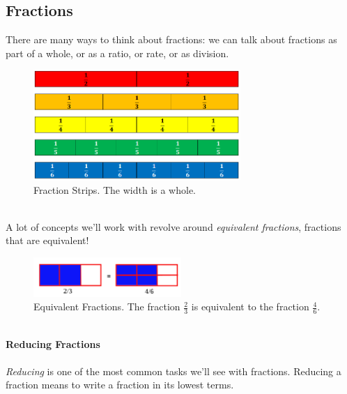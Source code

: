 \subsection{Fractions}
There are many ways to think about fractions: we can talk about fractions as part of a whole, or as a ratio, or rate, or as division.  
\begin{figure}[h!]
    \centering
    \includegraphics[width=0.7\textwidth]{img/FractionStrips.png}
    \caption{Fraction Strips. The width is a whole.}
    \label{fig:fraction-strips}
\end{figure}
\\
A lot of concepts we'll work with revolve around \emph{equivalent fractions}, fractions that are equivalent!
\begin{figure}[h!]
    \centering
    \includegraphics[width=0.5\textwidth]{img/fraction2-3.png}
    \caption{Equivalent Fractions.  The fraction \(\frac{2}{3}\) is equivalent to the fraction \(\frac{4}{6}\).}
    \label{fig:equivalent-fractions}
\end{figure}
\\ 
\textbf{Reducing Fractions}
\\ \\ 
\emph{Reducing} is one of the most common tasks we'll see with fractions.  Reducing a fraction means to write a fraction in its lowest terms.  





